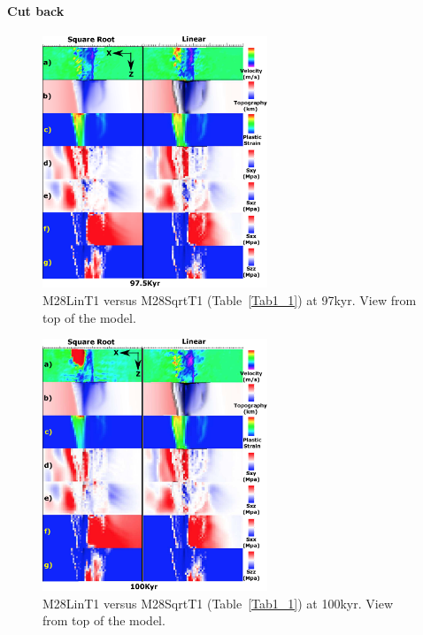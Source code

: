 \paragraph{Cut back}\label{para_CutBack}

\begin{figure}[h]
  \centering
    \includegraphics[width=0.6\textwidth]{fig_Results4_3_sqrt_vs_lin_cut_back_97kyr.eps}
  \caption{M28LinT1 versus M28SqrtT1 (Table~\hyperref[Tab1_1]{\ref{Tab1_1}}) at 97kyr. View from top of the model.}
 \label{fig_Results4_3_1}
\end{figure}  

\begin{figure}[h]
  \centering
    \includegraphics[width=0.6\textwidth]{fig_Results4_3_sqrt_vs_lin_cut_back_100kyr.eps}
  \caption{M28LinT1 versus M28SqrtT1 (Table~\hyperref[Tab1_1]{\ref{Tab1_1}}) at 100kyr. View from top of the model.}
 \label{fig_Results4_3_2}
\end{figure} 

